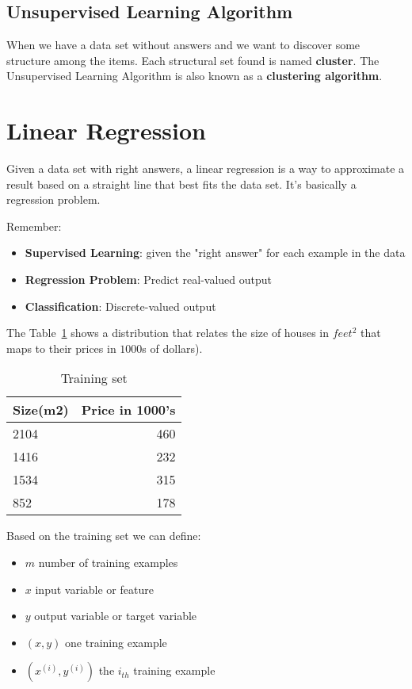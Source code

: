\documentclass[a4paper]{article}
\begin{document}
\subsection{Unsupervised Learning Algorithm}

When we have a data set without answers and we want to discover some structure among the items. Each structural set found is named \textbf{cluster}. The Unsupervised Learning Algorithm is also known as a \textbf{clustering algorithm}.

\section{Linear Regression}

Given a data set with right answers, a linear regression is a way to approximate a result based on a straight line that best fits the data set. It's basically a regression problem.

\medskip

Remember:

\begin{itemize}
\item \textbf{Supervised Learning}: given the "right answer" for each example in the data
\item \textbf{Regression Problem}: Predict real-valued output
\item \textbf{Classification}: Discrete-valued output
\end{itemize}

The Table~\ref{tab:training-set-example} shows a distribution that relates the size of houses in $feet^2$ that maps to their prices in $1000$s of dollars).

\begin{table}[]
\centering
\label{tab:training-set-example}
\begin{tabular}{l|r}
\textbf{Size(m2)} & \textbf{Price in 1000's} \\\hline
2104     & 460 \\
1416     & 232 \\
1534     & 315 \\
852      & 178
\end{tabular}
\caption{Training set}
\end{table}

Based on the training set we can define:

\begin{itemize}
\item $m$\: number of training examples
\item $x$\: input variable or feature
\item $y$\: output variable or target variable
\item $(x,y)$\: one training example
\item $(x^{(i)}, y^{(i)})$\: the $i_{th}$ training example
\end{itemize}
\end{document}
